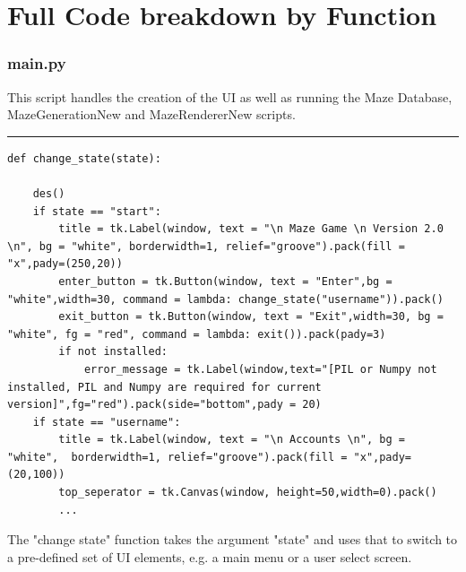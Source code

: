 
\clearpage
\part{Full Code breakdown by Function}
\section{main.py}
This script handles the creation of the UI as well as running the Maze Database, MazeGenerationNew and 
MazeRendererNew scripts.

\textcolor[RGB]{220,220,220}{\rule{\linewidth}{0.2pt}}
\begin{lstlisting}
def change_state(state):      

    des()
    if state == "start":    
        title = tk.Label(window, text = "\n Maze Game \n Version 2.0 \n", bg = "white", borderwidth=1, relief="groove").pack(fill = "x",pady=(250,20))
        enter_button = tk.Button(window, text = "Enter",bg = "white",width=30, command = lambda: change_state("username")).pack()
        exit_button = tk.Button(window, text = "Exit",width=30, bg = "white", fg = "red", command = lambda: exit()).pack(pady=3)
        if not installed:
            error_message = tk.Label(window,text="[PIL or Numpy not installed, PIL and Numpy are required for current version]",fg="red").pack(side="bottom",pady = 20)
    if state == "username": 
        title = tk.Label(window, text = "\n Accounts \n", bg = "white",  borderwidth=1, relief="groove").pack(fill = "x",pady=(20,100))
        top_seperator = tk.Canvas(window, height=50,width=0).pack()
        ...
\end{lstlisting}
The "change state" function takes the argument "state" and uses that to switch to a pre-defined set of UI elements, e.g. a main menu or a user select screen.

